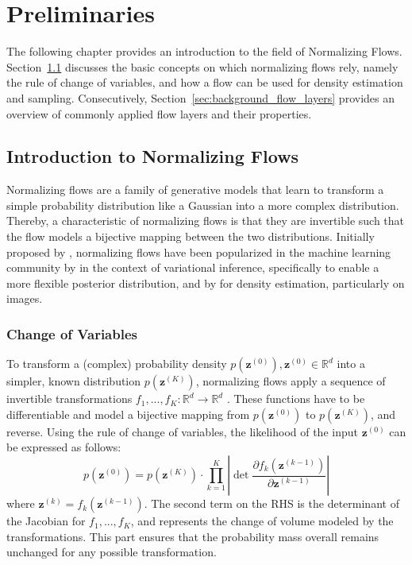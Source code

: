 \section{Preliminaries}
\label{sec:background}

The following chapter provides an introduction to the field of Normalizing Flows. 
Section~\ref{sec:background_introduction_NF} discusses the basic concepts on which normalizing flows rely, namely the rule of change of variables, and how a flow can be used for density estimation and sampling. 
Consecutively, Section~\ref{sec:background_flow_layers} provides an overview of commonly applied flow layers and their properties.

\subsection{Introduction to Normalizing Flows}
\label{sec:background_introduction_NF}

Normalizing flows are a family of generative models that learn to transform a simple probability distribution like a Gaussian into a more complex distribution. 
Thereby, a characteristic of normalizing flows is that they are invertible such that the flow models a bijective mapping between the two distributions.
Initially proposed by \citet{NormalizingFlowsOriginalMathConcept}, normalizing flows have been popularized in the machine learning community by \citet{NormalizingFlowsFundamentals} in the context of variational inference, specifically to enable a more flexible posterior distribution, and by \citet{RealNVP} for density estimation, particularly on images. 

\subsubsection{Change of Variables}
To transform a (complex) probability density $p\left(\bm{z}^{(0)}\right), \bm{z}^{(0)}\in\mathbb{R}^{d}$ into a simpler, known distribution $p\left(\bm{z}^{(K)}\right)$, normalizing flows apply a sequence of invertible transformations $f_1,...,f_K:\mathbb{R}^d \to \mathbb{R}^d$ \cite{NormalizingFlowsOriginalMathConcept, NormalizingFlowsFundamentals}. These functions have to be differentiable and model a bijective mapping from $p\left(\bm{z}^{(0)}\right)$ to $p\left(\bm{z}^{(K)}\right)$, and reverse. Using the rule of change of variables, the likelihood of the input $\bm{z}^{(0)}$ can be expressed as follows:
\begin{equation}
	\label{eqn:related_work_change_of_variables}
	p(\bm{z}^{(0)}) = p(\bm{z}^{(K)}) \cdot \prod_{k=1}^{K} \left|\det \frac{\partial f_k(\bm{z}^{(k-1)})}{\partial \bm{z}^{(k-1)}}\right|
\end{equation}
where $\bm{z}^{(k)}=f_{k}(\bm{z}^{(k-1)})$. The second term on the RHS is the determinant of the Jacobian for $f_1,...,f_K$, and represents the change of volume modeled by the transformations. This part ensures that the probability mass overall remains unchanged for any possible transformation.

